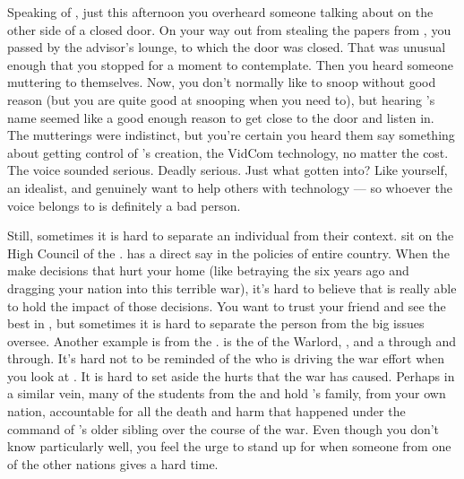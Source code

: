 \documentclass[char]{GL2020}
\begin{document}
Speaking of \cTechStar{}, just this afternoon you overheard someone talking about \cTechStar{\them} on the other side of a closed door. On your way out from stealing the papers from \cBunker{}, you passed by the advisor's lounge, to which the door was closed. That was unusual enough that you stopped for a moment to contemplate. Then you heard someone muttering to themselves. Now, you don't normally like to snoop without good reason (but you are quite good at snooping when you need to), but hearing \cTechStar{}'s name seemed like a good enough reason to get close to the door and listen in. The mutterings were indistinct, but you're certain you heard them say something about getting control of \cTechStar{}’s creation, the VidCom technology, no matter the cost. The voice sounded serious. Deadly serious. Just what \cTechStar{\have} \cTechStar{\they} gotten \cTechStar{\themself} into? Like yourself, \cTechStar{\theyare} an idealist, and genuinely want\cTechStar{\verbs} to help others with \cTechStar{\their} technology — so whoever the voice belongs to is definitely a bad person.

Still, sometimes it is hard to separate an individual from their context. \cTechStar{\They} sit\cTechStar{\verbs} on the High Council of the \pTech{}. \cTechStar{} has a direct say in the policies of \cTechStar{\their} entire country. When the \pTech{} make decisions that hurt your home (like betraying the \pShip{} six years ago and dragging your nation into this terrible war), it's hard to believe that \cTechStar{} is really able to hold the impact of those decisions. You want to trust your friend and see the best in \cTechStar{\them}, but sometimes it is hard to separate the person from the big issues \cTechStar{\they} oversee\cTechStar{\verbs}. Another example is \cWarlordDaughter{\full} from the \pShip{}. \cWarlordDaughter{} is the \cWarlordDaughter{\child} of the \pShippie{} Warlord, \cLoud{\full}, and a \pShippie{} through and through. It's hard not to be reminded of the \cLoud{\person} who is driving the war effort when you look at \cWarlordDaughter{\them}. It is hard to set aside the hurts that the war has caused. Perhaps in a similar vein, many of the students from the \pShip{} and \pTech{} hold \cLibAssist{\full}’s family, from your own nation, accountable for all the death and harm that happened under the command of \cLibAssist{}’s older sibling over the course of the war. Even though you don't know \cLibAssist{} particularly well, you feel the urge to stand up for \cLibAssist{\them} when someone from one of the other nations gives \cLibAssist{\them} a hard time. 
\end{document}
